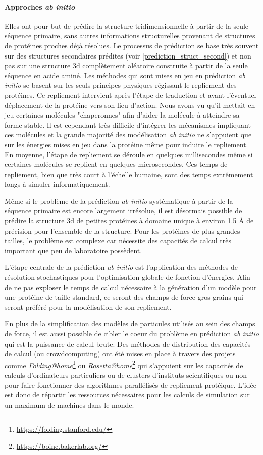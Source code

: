 \paragraph{Approches \textit{ab initio}} \label{ab_initio}

Elles ont pour but de prédire la structure tridimensionnelle à partir de la seule séquence primaire, sans autres informations structurelles provenant de structures de protéines proches déjà résolues. Le processus de prédiction se base très souvent sur des structures secondaires prédites (voir \ref{prediction_struct_second}) et non pas sur une structure 3d complètement aléatoire construite à partir de la seule séquence en acide aminé. 
Les méthodes qui sont mises en jeu en prédiction \textit{ab initio} se basent sur les seuls principes physiques régissant le repliement des protéines. Ce repliement intervient après l'étape de traduction et avant l'éventuel déplacement de la protéine vers son lieu d'action. Nous avons vu qu'il mettait en jeu certaines molécules "chaperonnes" afin d'aider la molécule à atteindre sa forme stable. Il est cependant très difficile d'intégrer les mécanismes impliquant ces molécules et la grande majorité des modélisation \textit{ab initio} ne s'appuient que sur les énergies mises en jeu dans la protéine même pour induire le repliement. En moyenne, l'étape de repliement se déroule en quelques millisecondes même si certaines molécules se replient en quelques microsecondes. Ces temps de repliement, bien que très court à l'échelle humaine, sont des temps extrêmement longs à simuler informatiquement.

Même si le problème de la prédiction \textit{ab initio} systématique à partir de la séquence primaire est encore largement irrésolue, il est désormais possible de prédire la structure 3d de petites protéines à domaine unique à environ 1.5 \r{A} de précision pour l'ensemble de la structure. Pour les protéines de plus grandes tailles, le problème est complexe car nécessite des capacités de calcul très important que peu de laboratoire possèdent.

L'étape centrale de la prédiction \textit{ab initio} est l'application des méthodes de résolution stochastiques pour l'optimisation globale de fonction d'énergies. Afin de ne pas exploser le temps de calcul nécessaire à la génération d'un modèle pour une protéine de taille standard, ce seront des champs de force gros grains qui seront préféré pour la modélisation de son repliement.

En plus de la simplification des modèles de particules utilisés au sein des champs de force, il est aussi possible de cibler le coeur du problème en prédiction \textit{ab initio} qui est la puissance de calcul brute. Des méthodes de distribution des capacités de calcul (ou crowdcomputing) ont été mises en place à travers des projets comme \textit{Folding@home}\footnote{\url{https://folding.stanford.edu/}} ou \textit{Rosetta@home}\footnote{\url{https://boinc.bakerlab.org/}} qui s'appuient sur les capacités de calculs d'ordinateurs particuliers ou de clusters d'instituts scientifiques ou non pour faire fonctionner des algorithmes parallélisés de repliement protéique. L'idée est donc de répartir les ressources nécessaires pour les calculs de simulation sur un maximum de machines dans le monde.

